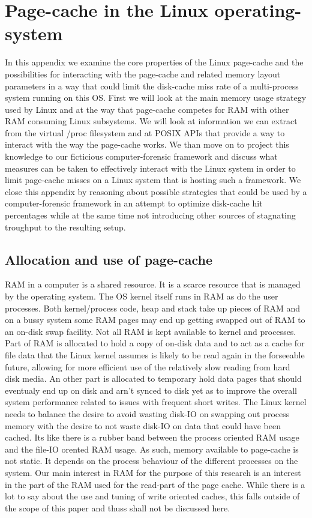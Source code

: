 \chapter{Page-cache in the Linux operating-system}
In this appendix we examine the core properties of the Linux page-cache and the possibilities for interacting with the page-cache and related memory layout parameters in a way that could limit the disk-cache miss rate of a multi-process system running on this OS. First we will look at the main memory usage strategy used by Linux and at the way that page-cache competes for RAM with other RAM consuming Linux subsystems. We will look at information we can extract from the virtual /proc filesystem and at POSIX APIs that provide a way to interact with the way the page-cache works. We than move on to project this knowledge to our ficticious computer-forensic framework and discuss what measures can be taken to effectively interact with the Linux system in order to limit page-cache misses on a Linux system that is hosting such a framework. We close this appendix by reasoning about possible strategies that could be used by a computer-forensic framework in an attempt to optimize disk-cache hit percentages while at the same time not introducing other sources of stagnating troughput to the resulting setup.
\section{Allocation and use of page-cache}
RAM in a computer is a shared resource. It is a scarce resource that is managed by the operating system. The OS kernel itself runs in RAM as do the user processes. Both kernel/process code, heap and stack take up pieces of RAM and on a bussy system some RAM pages may end up getting swapped out of RAM to an on-disk swap facility. Not all RAM is kept available to kernel and processes. Part of RAM is allocated to hold a copy of on-disk data and to act as a cache for file data that the Linux kernel assumes is likely to be read again in the forseeable future, allowing for more efficient use of the relatively slow reading from hard disk media. An other part is allocated to temporary hold data pages that should eventualy end up on disk and arn't synced to disk yet as to improve the overall system performance related to issues with frequent short writes. The Linux kernel needs to balance the desire to avoid wasting disk-IO on swapping out process memory with the desire to not waste disk-IO on data that could have been cached. Its like there is a rubber band between the process oriented RAM usage and the file-IO orented RAM usage. As such, memory available to page-cache is not static. It depends on the process behaviour of the different processes on the system. Our main interest in RAM for the purpose of this research is an interest in the part of the RAM used for the read-part of the page cache. While there is a lot to say about the use and tuning of write oriented caches, this falls outside of the scope of this paper and thuss shall not be discussed here. 

